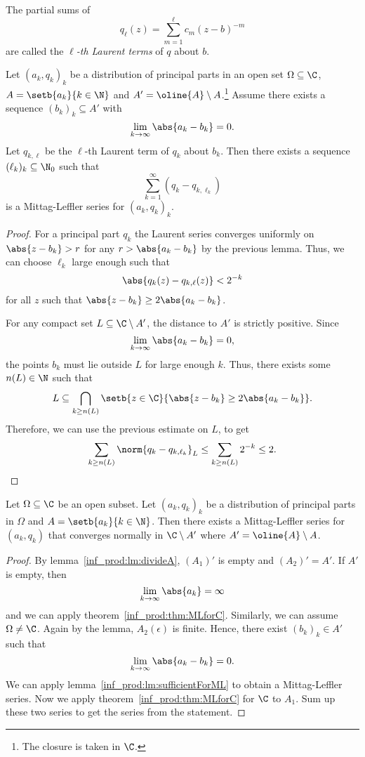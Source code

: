 \begin{definicija}
The partial sums of
\[
q_\ell(z) = \sum_{m = 1}^{\ell} c_m (z - b)^{ - m}
\]
are called the
\emph{$\ell$-th Laurent terms} of $q$ about
$b$.
\end{definicija}

\begin{lema}
\label{inf_prod:lm:sufficientForML}
Let $(a_k, q_k)_k$ be a distribution of principal parts in an open
set $\Omega \subseteq \C$, $A = \setb{a_k}{k \in \N}$ and
$A' = \oline{A} \setminus A$.\footnote{The closure is taken in
$\C$.} Assume there exists a sequence $(b_k)_k \subseteq A'$ with
\[
\lim_{k \to \infty} \abs{a_k - b_k} = 0.
\]
Let $q_{k, \ell}$ be the $\ell$-th Laurent term of $q_k$ about
$b_k$. Then there exists a sequence $(\ell_k)_k \subseteq \N_0$
such that
\[
\sum_{k=1}^{\infty}(q_k - q_{k, \ell_k})
\]
is a Mittag-Leffler series for $(a_k, q_k)_k$.
\end{lema}

\begin{proof}
For a principal part $q_k$ the Laurent series converges uniformly
on $\abs{z - b_k} > r$ for any $r > \abs{a_k - b_k}$ by the
previous lemma. Thus, we can choose $\ell_k$ large enough such that
\[
\abs{q_k(z) - q_{k, \ell}(z)} < 2^{-k}
\]
for all $z$ such that $\abs{z - b_k} \geq 2 \abs{a_k - b_k}$.

For any compact set $L \subseteq \C \setminus A'$, the distance to
$A'$ is strictly positive. Since
\[
\lim_{k \to \infty} \abs{a_k - b_k} = 0,
\]
the points $b_k$ must lie outside $L$ for large enough $k$. Thus,
there exists some $n(L) \in \N$ such that
\[
L \subseteq
\bigcap_{k \geq n(L)}
\setb{z \in \C}{\abs{z - b_k} \geq 2 \abs{a_k - b_k}}.
\]
Therefore, we can use the previous estimate on $L$, to get 
\[
\sum_{k \geq n(L)} \norm{q_k - q_{k, \ell_k}}_L \leq
\sum_{k \geq n(L)} 2^{- k} \leq
2. \qedhere
\]
\end{proof}

\begin{izrek}
\label{inf_prod:lm:MLTOpen}
Let $\Omega \subseteq \C$ be an open subset. Let $(a_k, q_k)_k$ be
a distribution of principal parts in $\Omega$ and
$A = \setb{a_k}{k \in \N}$. Then there exists a Mittag-Leffler
series for $(a_k, q_k)$ that converges normally in
$\C \setminus A'$ where $A' = \oline{A} \setminus A$.
\end{izrek}

\begin{proof}
By lemma~\ref{inf_prod:lm:divideA}, $(A_1)'$ is empty and
$(A_2)' = A'$. If $A'$ is empty, then
\[
\lim_{k \to \infty} \abs{a_k} = \infty
\]
and we can apply theorem~\ref{inf_prod:thm:MLforC}. Similarly, we
can assume $\Omega \neq \C$. Again by the lemma, $A_2(\epsilon)$ is
finite. Hence, there exist $(b_k)_k \in A'$ such that
\[
\lim_{k \to \infty} \abs{a_k - b_k} = 0.
\]
We can apply lemma~\ref{inf_prod:lm:sufficientForML} to obtain a
Mittag-Leffler series. Now we apply
theorem~\ref{inf_prod:thm:MLforC} for $\C$ to $A_1$. Sum up these
two series to get the series from the statement.
\end{proof}

